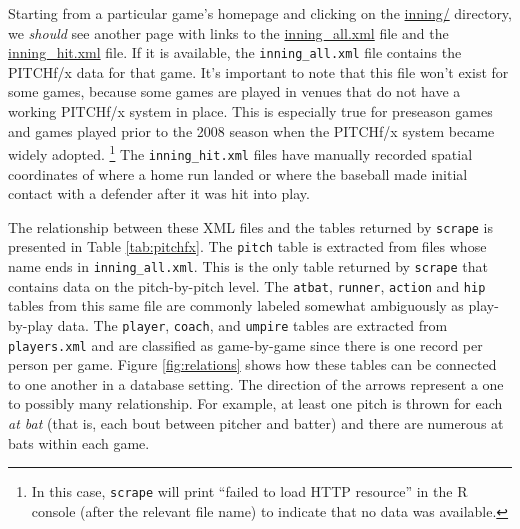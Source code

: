 \documentclass[12pt,]{isuthesis}
\let\rmarkdownfootnote\footnote%
\def\footnote{\protect\rmarkdownfootnote}
\begin{document}
Starting from a particular game's homepage and clicking on the
\href{http://gd2.mlb.com/components/game/mlb/year_2011/month_02/day_26/gid_2011_02_26_phimlb_nyamlb_1/inning/}{inning/}
directory, we \emph{should} see another page with links to the
\href{http://gd2.mlb.com/components/game/mlb/year_2011/month_02/day_26/gid_2011_02_26_phimlb_nyamlb_1/inning/inning_all.xml}{inning\_all.xml}
file and the
\href{http://gd2.mlb.com/components/game/mlb/year_2011/month_02/day_26/gid_2011_02_26_phimlb_nyamlb_1/inning/inning_hit.xml}{inning\_hit.xml}
file. If it is available, the \texttt{inning\_all.xml} file contains the
PITCHf/x data for that game. It's important to note that this file won't
exist for some games, because some games are played in venues that do
not have a working PITCHf/x system in place. This is especially true for
preseason games and games played prior to the 2008 season when the
PITCHf/x system became widely adopted.
\footnote{In this case, \texttt{scrape} will print ``failed to load HTTP resource''
in the R console (after the relevant file name) to indicate that no
data was available.
} The \texttt{inning\_hit.xml} files have manually recorded spatial
coordinates of where a home run landed or where the baseball made
initial contact with a defender after it was hit into play.

The relationship between these XML files and the tables returned by
\texttt{scrape} is presented in Table \ref{tab:pitchfx}. The
\texttt{pitch} table is extracted from files whose name ends in
\texttt{inning\_all.xml}. This is the only table returned by
\texttt{scrape} that contains data on the pitch-by-pitch level. The
\texttt{atbat}, \texttt{runner}, \texttt{action} and \texttt{hip} tables
from this same file are commonly labeled somewhat ambiguously as
play-by-play data. The \texttt{player}, \texttt{coach}, and
\texttt{umpire} tables are extracted from \texttt{players.xml} and are
classified as game-by-game since there is one record per person per
game. Figure \ref{fig:relations} shows how these tables can be connected
to one another in a database setting. The direction of the arrows
represent a one to possibly many relationship. For example, at least one
pitch is thrown for each \textit{at bat} (that is, each bout between
pitcher and batter) and there are numerous at bats within each game.
\end{document}
